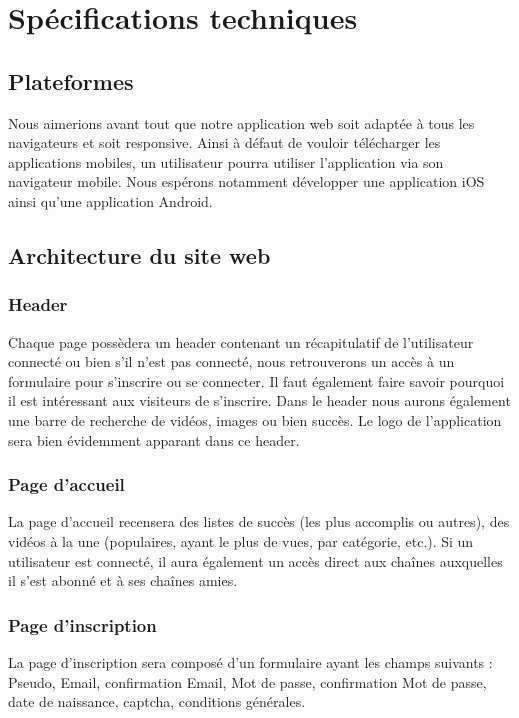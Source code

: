 \documentclass[a4paper,10pt]{article}
\begin{document}
\section{Spécifications techniques}
\subsection{Plateformes}
Nous aimerions avant tout que notre application web soit adaptée à tous les navigateurs et soit responsive. Ainsi à défaut de vouloir télécharger les applications mobiles, un utilisateur pourra utiliser l'application via son navigateur mobile. Nous espérons notamment développer une application iOS ainsi qu'une application Android.

\subsection{Architecture du site web}

\subsubsection{Header}

Chaque page possèdera un header contenant un récapitulatif de l'utilisateur connecté ou bien s'il n'est pas connecté, nous retrouverons un accès à un formulaire pour s'inscrire ou se connecter. Il faut également faire savoir pourquoi il est intéressant aux visiteurs de s'inscrire. Dans le header nous aurons également une barre de recherche de vidéos, images ou bien succès. Le logo de l'application sera bien évidemment apparant dans ce header.~\

\subsubsection{Page d'accueil}

La page d'accueil recensera des listes de succès (les plus accomplis ou autres), des vidéos à la une (populaires, ayant le plus de vues, par catégorie, etc.). Si un utilisateur est connecté, il aura également un accès direct aux chaînes auxquelles il s'est abonné et à ses chaînes amies.

\subsubsection{Page d'inscription}

La page d'inscription sera composé d'un formulaire ayant les champs suivants : Pseudo, Email, confirmation Email, Mot de passe, confirmation Mot de passe, date de naissance, captcha, conditions générales.
\end{document}
